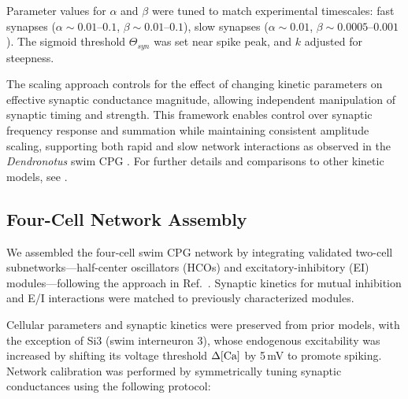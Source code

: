 \documentclass[nofootinbib,aip,amsmath,amssymb,reprint,twocolumn,10pt]{revtex4-2}
\begin{document}
Parameter values for $\alpha$ and $\beta$ were tuned to match experimental timescales: fast synapses ($\alpha \sim 0.01$--$0.1$, $\beta \sim 0.01$--$0.1$), slow synapses ($\alpha \sim 0.01$, $\beta \sim 0.0005$--$0.001$). The sigmoid threshold $\Theta_{syn}$ was set near spike peak, and $k$ adjusted for steepness.

The scaling approach controls for the effect of changing kinetic parameters on effective synaptic conductance magnitude, allowing independent manipulation of synaptic timing and strength. This framework enables control over synaptic frequency response and summation while maintaining consistent amplitude scaling, supporting both rapid and slow network interactions as observed in the \textit{Dendronotus} swim CPG \cite{SakuraiKatz2016, scully2024pairing}. For further details and comparisons to other kinetic models, see \cite{destexhe1998kinetic, Hill2001}.

\subsection{Four-Cell Network Assembly}

We assembled the four-cell swim CPG network by integrating validated two-cell subnetworks---half-center oscillators (HCOs) and excitatory-inhibitory (EI) modules---following the approach in Ref.~\cite{scully2024pairing}. Synaptic kinetics for mutual inhibition and E/I interactions were matched to previously characterized modules.

Cellular parameters and synaptic kinetics were preserved from prior models, with the exception of Si3 (swim interneuron 3), whose endogenous excitability was increased by shifting its voltage threshold $\Delta [\rm Ca]$ by 5\,mV to promote spiking. Network calibration was performed by symmetrically tuning synaptic conductances using the following protocol:
\end{document}
